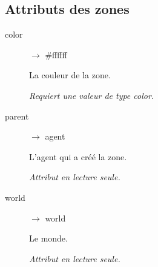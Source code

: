 \subsection{Attributs des zones}

\begin{description}
	\item[color] $\rightarrow$ \#ffffff

	La couleur de la zone.

	\emph{Requiert une valeur de type color.}

	\item[parent] $\rightarrow$ agent

	L'agent qui a créé la zone.

	\emph{Attribut en lecture seule.}

	\item[world] $\rightarrow$ world

	Le monde.

	\emph{Attribut en lecture seule.}
\end{description}

